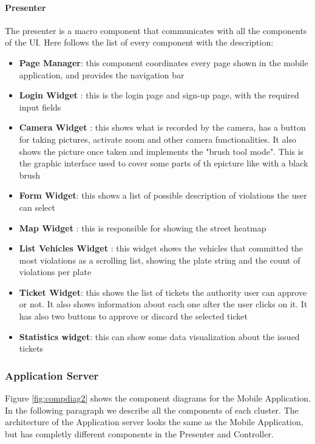 \paragraph{Presenter}
The presenter is a macro component that communicates with all the components of the UI.
Here follows the list of every component with the description:
\begin{itemize}
  \item \textbf{Page Manager}: this component coordinates every page shown in the mobile application, and provides the navigation bar
  \item \textbf{Login Widget} : this is the login page and sign-up page, with the required input fields
  \item \textbf{Camera Widget} : this shows what is recorded by the camera, has a button for taking pictures, activate zoom and other camera functionalities. It also shows the picture once taken and implements the "brush tool mode". This is the graphic interface used to cover some parts of th epicture like with a black brush
  \item \textbf{Form Widget}: this shows a list of possible description of violations the user can select
  \item \textbf{Map Widget} : this is responsible for showing the street heatmap
  \item \textbf{List Vehicles Widget} : this widget shows the vehicles that committed the most violations as a scrolling list, showing the plate string and the count of violations per plate
  \item \textbf{Ticket Widget}: this shows the list of tickets the authority user can approve or not. It also shows information about each one after the user clicks on it. It has also two buttons to approve or discard the selected ticket
  \item \textbf{Statistics widget}: this can show some data visualization about the issued tickets
\end{itemize}



\subsubsection{Application Server} \label{API}
Figure \ref{fig:compdiag2} shows the component diagrams for the Mobile Application. In the following paragraph we describe all the components of each cluster.
The architecture of the Application server looks the same as the Mobile Application, but has completly different components in the Presenter and Controller.

